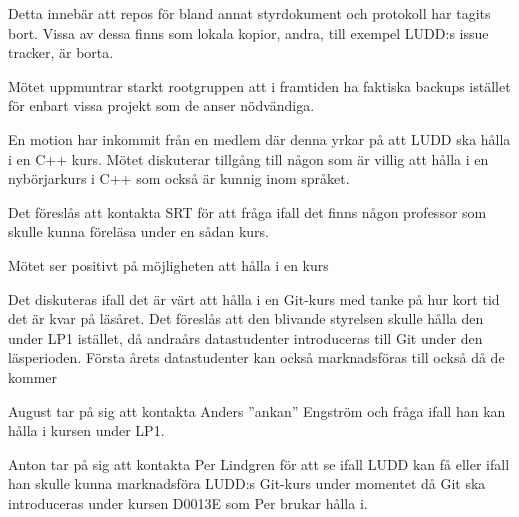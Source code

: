 \documentclass{protokoll}
\begin{document}
Detta innebär att repos för bland annat styrdokument och protokoll har tagits
bort. Vissa av dessa finns som lokala kopior, andra, till exempel LUDD:s issue
tracker, är borta.

Mötet uppmuntrar starkt rootgruppen att i framtiden ha faktiska backups
istället för enbart vissa projekt som de anser nödvändiga.

En motion har inkommit från en medlem där denna yrkar på att LUDD ska hålla
i en C++ kurs. 
Mötet diskuterar tillgång till någon som är villig att hålla i en nybörjarkurs
i C++ som också är kunnig inom språket. 

Det föreslås att kontakta SRT för att fråga ifall det finns någon professor som
skulle kunna föreläsa under en sådan kurs. 

Mötet ser positivt på möjligheten att hålla i en kurs 

Det diskuteras ifall det är värt att hålla i en Git-kurs med tanke på hur kort 
tid det är kvar på läsåret. Det föreslås att den blivande styrelsen skulle 
hålla den under LP1 istället, då andraårs datastudenter introduceras till Git 
under den läsperioden. Första årets datastudenter kan också marknadsföras till
också då de kommer 

August tar på sig att kontakta Anders ''ankan'' Engström och fråga ifall han 
kan hålla i kursen under LP1.

Anton tar på sig att kontakta Per Lindgren för att se ifall LUDD kan få eller
ifall han skulle kunna marknadsföra LUDD:s Git-kurs under momentet då Git 
ska introduceras under kursen D0013E som Per brukar hålla i.
\end{document}
